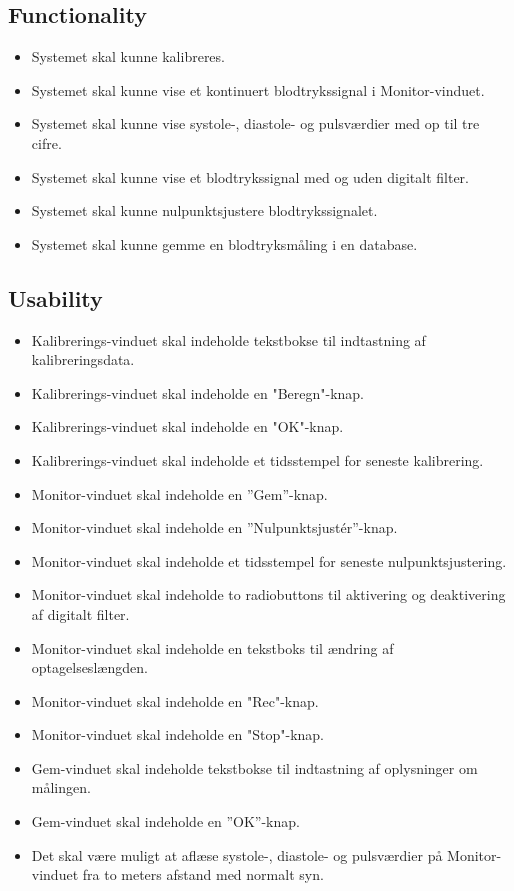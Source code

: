 \subsection{Functionality}
\begin{itemize}
	\item Systemet skal kunne kalibreres. 
	\item Systemet skal kunne vise et kontinuert blodtrykssignal i Monitor-vinduet.
	\item Systemet skal kunne vise systole-, diastole- og pulsværdier med op til tre cifre.
	\item Systemet skal kunne vise et blodtrykssignal med og uden digitalt filter.
	\item Systemet skal kunne nulpunktsjustere blodtrykssignalet.
	\item Systemet skal kunne gemme en blodtryksmåling i en database.
\end{itemize}

\subsection{Usability}
\begin{itemize}
	\item Kalibrerings-vinduet skal indeholde tekstbokse til indtastning af kalibreringsdata. 
	\item Kalibrerings-vinduet skal indeholde en "Beregn"\--knap. 
	\item Kalibrerings-vinduet skal indeholde en "OK"\--knap.
	\item Kalibrerings-vinduet skal indeholde et tidsstempel for seneste kalibrering.
	\item Monitor-vinduet skal indeholde en ”Gem”\--knap.
	\item Monitor-vinduet skal indeholde en ”Nulpunktsjustér”\--knap.
	\item Monitor-vinduet skal indeholde et tidsstempel for seneste nulpunktsjustering.
	\item Monitor-vinduet skal indeholde to radiobuttons til aktivering og deaktivering af digitalt filter.
	\item Monitor-vinduet skal indeholde en tekstboks til ændring af optagelseslængden.  
	\item Monitor-vinduet skal indeholde en "Rec"\--knap.
	\item Monitor-vinduet skal indeholde en "Stop"\--knap.
	\item Gem-vinduet skal indeholde tekstbokse til indtastning af oplysninger om målingen. 
	\item Gem-vinduet skal indeholde en ”OK”\--knap.
	\item Det skal være muligt at aflæse systole-, diastole- og pulsværdier på Monitor-vinduet fra to meters afstand med normalt syn.
\end{itemize}

